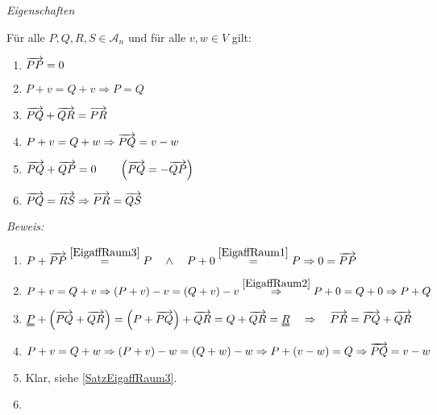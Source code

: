 \begin{mysatz} \textit{Eigenschaften}

    Für alle $P,Q,R,S \in \mathcal{A}_n$ und für alle $v,w \in V$ gilt:
    \begin{enumerate}
        \item $\overrightarrow{PP} = 0$
        \item $P + v = Q + v \Rightarrow P = Q$
        \item \label{SatzEigaffRaum3} $\overrightarrow{PQ} + \overrightarrow{QR} = \overrightarrow{PR}$
        \item $P + v = Q + w \Rightarrow \overrightarrow{PQ} = v - w$
        \item $\overrightarrow{PQ} + \overrightarrow{QP} = 0 \qquad \left( \overrightarrow{PQ} = - \overrightarrow{QP}  \right)$
        \item $\overrightarrow{PQ} = \overrightarrow{RS} \Rightarrow \overrightarrow{PR} = \overrightarrow{QS}$
    \end{enumerate}
    \textit{Beweis:}
    \begin{enumerate}
        \item $P + \overrightarrow{PP} \stackrel{\ref{EigaffRaum3}}= P \quad \wedge \quad P + 0 \stackrel{\ref{EigaffRaum1}}= P \Rightarrow 0 = \overrightarrow{PP}$
        \item $P + v = Q + v \Rightarrow (P + v) - v = (Q + v) - v \stackrel{\ref{EigaffRaum2}}\Rightarrow P + 0 = Q + 0 \Rightarrow P + Q$
        \item $\uuline{P} + \left( \ora{PQ} + \ora{QR} \right) = \left( P + \ora{PQ} \right) + \ora{QR} = Q + \ora{QR} = \uuline{R} \quad \Rightarrow \quad \ora{PR} = \ora{PQ} + \ora{QR}$
        \item $P + v = Q + w \Rightarrow \left( P + v \right) - w = \left( Q + w \right) - w \Rightarrow P + (v - w) = Q \Rightarrow \overrightarrow{PQ} = v - w$
        \item Klar, siehe \ref{SatzEigaffRaum3}.
        \item \ \\
            \begin{minipage}{0.3\textwidth}
                \begin{center}
\end{center}
\end{minipage}
\end{enumerate}
\end{mysatz}
